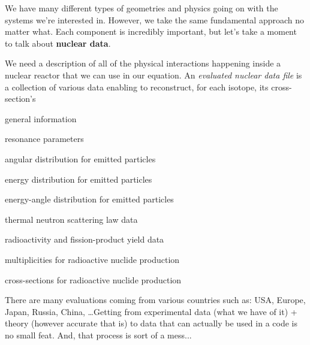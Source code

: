 \documentclass[12pt]{article}
\begin{document}
We have many different types of geometries and physics going on with the 
systems we're interested in. However, we take the same fundamental approach no 
matter what. Each component is incredibly important, but let's take a moment 
to talk about \textbf{nuclear data}.

We need a description of all of the physical interactions happening inside a 
nuclear reactor that we can use in our equation. An \textit{evaluated nuclear 
data file} is a collection of various data enabling to reconstruct, for each 
isotope, its cross-section's 

\begin{compactitem}
\item general information
\item resonance parameters 
\item angular distribution for emitted particles 
\item energy distribution for emitted particles 
\item energy-angle distribution for emitted particles 
\item thermal neutron scattering law data 
\item radioactivity and fission-product yield data 
\item multiplicities for radioactive nuclide production 
\item cross-sections for radioactive nuclide production
\end{compactitem}

There are many evaluations coming from various countries such as: USA, Europe, 
Japan, Russia, China, \dots Getting from experimental data (what we have of 
it) + theory (however accurate that is) to data that can actually be used in a 
code is no small feat. And, that process is sort of a mess...
\pagebreak
\end{document}
